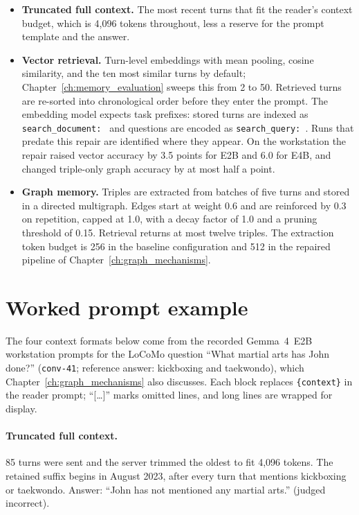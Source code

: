 \begin{itemize}
  \item \textbf{Truncated full context.} The most recent turns that fit the reader's context
        budget, which is 4,096 tokens throughout, less a reserve for the prompt template and
        the answer.
  \item \textbf{Vector retrieval.} Turn-level embeddings with mean pooling, cosine similarity,
        and the ten most similar turns by default; Chapter~\ref{ch:memory_evaluation} sweeps
        this from 2 to 50. Retrieved turns are re-sorted into chronological order before they
        enter the prompt. The embedding model expects task prefixes: stored turns are indexed
        as \texttt{search\_document:~} and questions are encoded as \texttt{search\_query:~}.
        Runs that predate this repair are identified where they appear. On the workstation the
        repair raised vector accuracy by 3.5 points for E2B and 6.0 for E4B, and changed
        triple-only graph accuracy by at most half a point.
  \item \textbf{Graph memory.} Triples are extracted from batches of five turns and stored in a
        directed multigraph. Edges start at weight 0.6 and are reinforced by 0.3 on repetition,
        capped at 1.0, with a decay factor of 1.0 and a pruning threshold of 0.15. Retrieval
        returns at most twelve triples. The extraction token budget is 256 in the baseline
        configuration and 512 in the repaired pipeline of Chapter~\ref{ch:graph_mechanisms}.
\end{itemize}

\section{Worked prompt example}
\label{app:repro_example}

The four context formats below come from the recorded Gemma~4~E2B workstation prompts for the
LoCoMo question ``What martial arts has John done?'' (\texttt{conv-41}; reference answer:
kickboxing and taekwondo), which Chapter~\ref{ch:graph_mechanisms} also discusses. Each block
replaces \texttt{\{context\}} in the reader prompt; ``[\ldots]'' marks omitted lines, and long
lines are wrapped for display.

\paragraph{Truncated full context.} 85 turns were sent and the server trimmed the oldest to fit
4,096 tokens. The retained suffix begins in August 2023, after every turn that mentions kickboxing
or taekwondo. Answer: ``John has not mentioned any martial arts.'' (judged incorrect).

